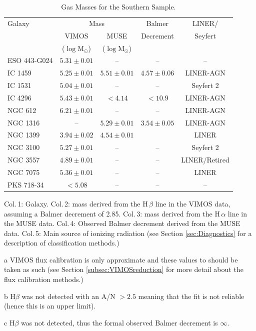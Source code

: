 \begin{table}
	\centering
\begin{threeparttable}
	\caption{Gas Masses for the Southern Sample.}
	\label{tab:gasMass}
	\begin{tabular}{l c c c c}
		\hline
		\hline
		Galaxy & \multicolumn{2}{c}{\ion{H}{ii} Mass} & Balmer & LINER/ \\
		& VIMOS\tnote{a} & MUSE & Decrement & Seyfert \\
		& ($\log\mathrm{M_\odot}$) & ($\log\mathrm{M_\odot}$) & \\
		\hline
		ESO 443-G024 & $5.31 \pm 0.01$ 	& --  		& -- & -- \\
		IC 1459 	& $5.25 \pm 0.01$	& $5.51 \pm 0.01$ & $4.57 \pm 0.06$ & LINER-AGN\\
		IC 1531 	& $5.04 \pm 0.01$	& -- 		& -- & Seyfert 2\\
		IC 4296		& $5.43 \pm 0.01$	& $< 4.14$ 	& $<10.9$\tnote{b} & LINER-AGN \\
		NGC 612 	& $6.21 \pm 0.01$ 	& -- 		& -- & LINER-AGN \\
		NGC 1316 	& -- 				& $ 5.29 \pm 0.01$ & $3.54 \pm 0.05$ & LINER-AGN \\
		NGC 1399 	& $3.94 \pm 0.02$ 	& $ 4.54 \pm 0.01$ & \tnote{c} & LINER \\
		NGC 3100 	& $5.27 \pm 0.01$	& -- 		& -- & Seyfert 2 \\
		NGC 3557 	& $4.89 \pm 0.01$ 	& -- 		& -- & LINER/Retired \\
		NGC 7075 	& $5.36 \pm 0.01$	& -- 		& -- & LINER \\
		PKS 718-34  & $< 5.08$	 		& -- 		& -- & -- \\
		\hline
		\hline
	\end{tabular}
	\begin{tablenotes}
	\footnotesize
	\note Col.\,1: Galaxy. Col.\,2:  mass derived from the H\,$\beta$ line in the VIMOS data, assuming a Balmer decrement of 2.85. Col.\,3:  mass derived from the H\,$\alpha$ line in the MUSE data. Col.\,4: Observed Balmer decrement derived from the MUSE data. Col.\,5: Main source of ionizing radiation (see Section \ref{sec:Diagnostics} for a description of classification methods.)
	\item [a] VIMOS flux calibration is only approximate and these values to should be taken as such (see Section \ref{subsec:VIMOSreduction} for more detail about the flux calibration methods.)
	\item [b] H$\beta$ was not detected with an A/N $> 2.5$ meaning that the fit is not reliable (hence this is an upper limit). 
	\item [c] H$\beta$ was not detected, thus the formal observed Balmer decrement is $\infty$.
	\end{tablenotes}
\end{threeparttable}
\end{table}



